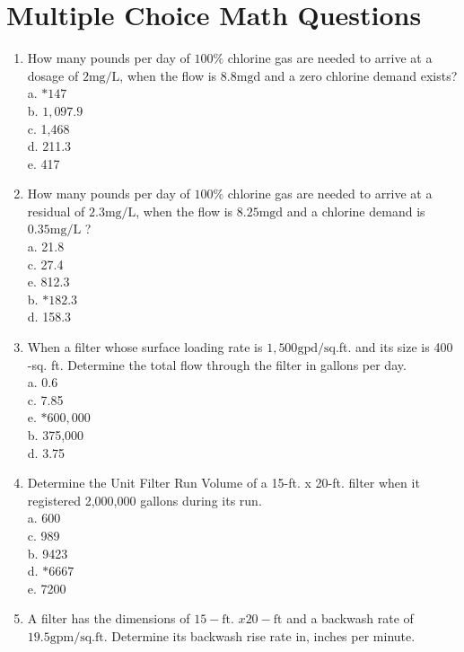 \section*{Multiple Choice Math Questions}
\begin{enumerate}
\item How many pounds per day of $100 \%$ chlorine gas are needed to arrive at a dosage of $2 \mathrm{mg} / \mathrm{L}$, when the flow is $8.8 \mathrm{mgd}$ and a zero chlorine demand exists?\\
a. $* 147$\\
b. $1,097.9$\\
c. 1,468\\
d. 211.3\\
e. 417\\
\item How many pounds per day of $100 \%$ chlorine gas are needed to arrive at a residual of $2.3 \mathrm{mg} / \mathrm{L}$, when the flow is $8.25 \mathrm{mgd}$ and a chlorine demand is $0.35 \mathrm{mg} / \mathrm{L}$ ?\\
a. 21.8\\
c. 27.4\\
e. 812.3\\
b. $* 182.3$\\
d. 158.3\\
\item When a filter whose surface loading rate is $1,500 \mathrm{gpd} / \mathrm{sq}$.ft. and its size is 400 -sq. ft. Determine the total flow through the filter in gallons per day.\\
a. 0.6\\
c. 7.85\\
e. $* 600,000$\\
b. 375,000\\
d. 3.75\\
\item Determine the Unit Filter Run Volume of a 15-ft. x 20-ft. filter when it registered 2,000,000 gallons during its run.\\
a. 600\\
c. 989\\
b. 9423\\
d. $* 6667$\\
e. 7200\\
\item A filter has the dimensions of $15-\mathrm{ft}$. $x 20-\mathrm{ft}$ and a backwash rate of $19.5 \mathrm{gpm} / \mathrm{sq} . \mathrm{ft}$. Determine its backwash rise rate in, inches per minute.\\

\end{enumerate}
